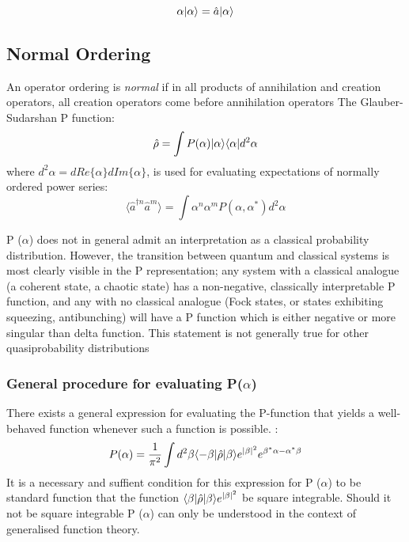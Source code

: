 \begin{equation}
\alpha | \alpha \rangle = \hat{a} | \alpha \rangle
\end{equation}

\subsection{Normal Ordering}
An operator ordering is \emph{normal} if in all products of annihilation and creation operators, all creation operators come before annihilation operators \cite{Mandl2010} The Glauber-Sudarshan P function\cite{Cahill1969}:
\begin{equation}
	\hat{\rho} = \int P(\alpha) | \alpha \rangle \langle \alpha | d^2 \alpha
	\end{equation}
where $d^2 \alpha = dRe\{\alpha \}dIm\{\alpha \}$, is used for evaluating expectations of normally ordered power series:
\begin{equation}
	\langle \hat{a}^{\dagger n} \hat{a}^{m}  \rangle = \int \alpha^n \alpha^m P (\alpha, \alpha^*) d^2 \alpha
\end{equation}

P ($\alpha$) does not in general admit an interpretation as a classical probability distribution.
However, the transition between quantum and classical systems is most clearly visible in the P representation; any system with a classical analogue (a coherent state, a chaotic state) has a non-negative, classically interpretable P function, and any with no classical analogue (Fock states, or states exhibiting squeezing, antibunching) will have a P function which is either negative or more singular than delta function.
This statement is not generally true for other quasiprobability distributions\cite{Mandel1995}

\subsubsection{General procedure for evaluating P($\alpha$)}\label{mehta}
There exists a general expression for evaluating the P-function that yields a well-behaved function whenever such a function is possible.
\cite{Mehta1967}:
\begin{equation}
	P(\alpha) = \frac{1}{\pi^2} \int d^2 \beta \langle-\beta | \hat{\rho} | \beta \rangle e^{|\beta|^2} e^{\beta^* \alpha -\alpha^* \beta}
\end{equation}
It is a necessary and suffient condition for this expression for P ($\alpha$) to be standard function that the function $ \langle\beta | \hat{\rho} | \beta \rangle e^{|\beta|^2} $ be square integrable.
Should it not be square integrable P ($\alpha$) can only be understood in the context of generalised function theory.

